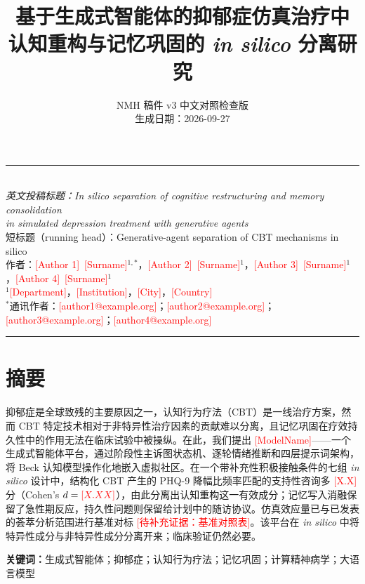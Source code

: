 \documentclass[11pt,a4paper]{article}
\title{\textbf{基于生成式智能体的抑郁症仿真治疗中\\认知重构与记忆巩固的 \emph{in silico} 分离研究}}
\author{NMH 稿件 v3 中文对照检查版 \\ \small 生成日期：2026-09-27}
\date{}
\newcommand{\ph}[1]{\textcolor{red}{[#1]}}
\begin{document}
\maketitle

\begin{center}
\rule{\textwidth}{0.5pt}\\[0.3em]
\small\textit{英文投稿标题：In silico separation of cognitive restructuring and memory consolidation\\
in simulated depression treatment with generative agents}\\[0.2em]
\small 短标题（running head）：Generative-agent separation of CBT mechanisms in silico\\[0.4em]
\small 作者：\ph{Author 1}~\ph{Surname}$^{1,*}$，\ph{Author 2}~\ph{Surname}$^{1}$，\ph{Author 3}~\ph{Surname}$^{1}$，\ph{Author 4}~\ph{Surname}$^{1}$\\
\small $^{1}$\ph{Department}，\ph{Institution}，\ph{City}，\ph{Country}\\
\small $^{*}$通讯作者：\ph{author1@example.org}；\ph{author2@example.org}；\ph{author3@example.org}；\ph{author4@example.org}\\[0.3em]
\rule{\textwidth}{0.5pt}
\end{center}

\vspace{0.5em}

\section*{摘要}

抑郁症是全球致残的主要原因之一，认知行为疗法（CBT）是一线治疗方案，然而 CBT 特定技术相对于非特异性治疗因素的贡献难以分离，且记忆巩固在疗效持久性中的作用无法在临床试验中被操纵。在此，我们提出 \ph{ModelName}——一个生成式智能体平台，通过阶段性主诉图状态机、逐轮情绪推断和四层提示词架构，将 Beck 认知模型操作化地嵌入虚拟社区。在一个带补充性积极接触条件的七组 \emph{in silico} 设计中，结构化 CBT 产生的 PHQ-9 降幅比频率匹配的支持性咨询多 \ph{X.X} 分（Cohen's $d = \ph{X.XX}$），由此分离出认知重构这一有效成分；记忆写入消融保留了急性期反应，持久性问题则保留给计划中的随访协议。仿真效应量已与已发表的荟萃分析范围进行基准对标 \ph{待补充证据：基准对照表}。该平台在 \emph{in silico} 中将特异性成分与非特异性成分分离开来；临床验证仍然必要。

\vspace{0.5em}
\noindent\textbf{关键词：}生成式智能体；抑郁症；认知行为疗法；记忆巩固；计算精神病学；大语言模型
\end{document}
